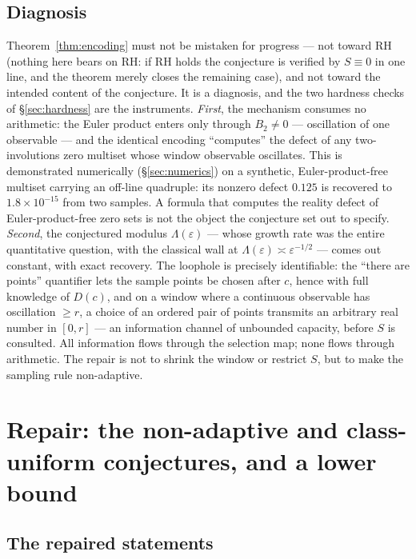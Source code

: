 \documentclass[11pt]{amsart}
\theoremstyle{plain}
\theoremstyle{definition}
\theoremstyle{remark}
\begin{document}
\subsection*{Diagnosis}
Theorem~\ref{thm:encoding} must not be mistaken for progress --- not toward RH (nothing here bears
on RH: if RH holds the conjecture is verified by $S\equiv0$ in one line, and the theorem merely
closes the remaining case), and not toward the intended content of the conjecture. It is a
diagnosis, and the two hardness checks of \S\ref{sec:hardness} are the instruments. \emph{First},
the mechanism consumes no arithmetic: the Euler product enters only through $B_2\ne0$ ---
oscillation of one observable --- and the identical encoding ``computes'' the defect of any
two-involutions zero multiset whose window observable oscillates. This is demonstrated numerically
(\S\ref{sec:numerics}) on a synthetic, Euler-product-free multiset carrying an off-line quadruple:
its nonzero defect $0.125$ is recovered to $1.8\times10^{-15}$ from two samples. A formula that
computes the reality defect of Euler-product-free zero sets is not the object the conjecture set
out to specify. \emph{Second}, the conjectured modulus $\Lambda(\varepsilon)$ --- whose growth rate was
the entire quantitative question, with the classical wall at
$\Lambda(\varepsilon)\asymp\varepsilon^{-1/2}$ --- comes out constant, with exact recovery. The
loophole is precisely identifiable: the ``there are points'' quantifier lets the sample points be
chosen after $c$, hence with full knowledge of $D(c)$, and on a window where a continuous
observable has oscillation $\ge r$, a choice of an ordered pair of points transmits an arbitrary
real number in $[0,r]$ --- an information channel of unbounded capacity, before $S$ is consulted.
All information flows through the selection map; none flows through arithmetic. The repair is
not to shrink the window or restrict $S$, but to make the sampling rule non-adaptive.

\section{Repair: the non-adaptive and class-uniform conjectures, and a lower bound}\label{sec:repair}

\subsection{The repaired statements}
\end{document}
